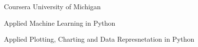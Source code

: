 

\begin{cventries}

  \cventry
    {Coursera}
    {University of Michigan}
    {}
    {}
    {
      \begin{cvitems} %
        \item {Applied Machine Learning in Python}
	\item {Applied Plotting, Charting and Data Represnetation in Python}	
      \end{cvitems}
    }

\end{cventries}
